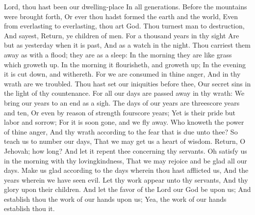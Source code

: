 Lord, thou hast been our dwelling-place In all generations.  Before the mountains were brought forth, Or ever thou hadst formed the earth and the world, Even from everlasting to everlasting, thou art God.  Thou turnest man to destruction, And sayest, Return, ye children of men.  For a thousand years in thy sight Are but as yesterday when it is past, And as a watch in the night.  Thou carriest them away as with a flood; they are as a sleep: In the morning they are like grass which groweth up.  In the morning it flourisheth, and groweth up; In the evening it is cut down, and withereth.  For we are consumed in thine anger, And in thy wrath are we troubled.  Thou hast set our iniquities before thee, Our secret sins in the light of thy countenance.  For all our days are passed away in thy wrath: We bring our years to an end as a sigh.  The days of our years are threescore years and ten, Or even by reason of strength fourscore years; Yet is their pride but labor and sorrow; For it is soon gone, and we fly away.  Who knoweth the power of thine anger, And thy wrath according to the fear that is due unto thee?  So teach us to number our days, That we may get us a heart of wisdom.  Return, O Jehovah; how long? And let it repent thee concerning thy servants.  Oh satisfy us in the morning with thy lovingkindness, That we may rejoice and be glad all our days.  Make us glad according to the days wherein thou hast afflicted us, And the years wherein we have seen evil.  Let thy work appear unto thy servants, And thy glory upon their children.  And let the favor of the Lord our God be upon us; And establish thou the work of our hands upon us; Yea, the work of our hands establish thou it. 

